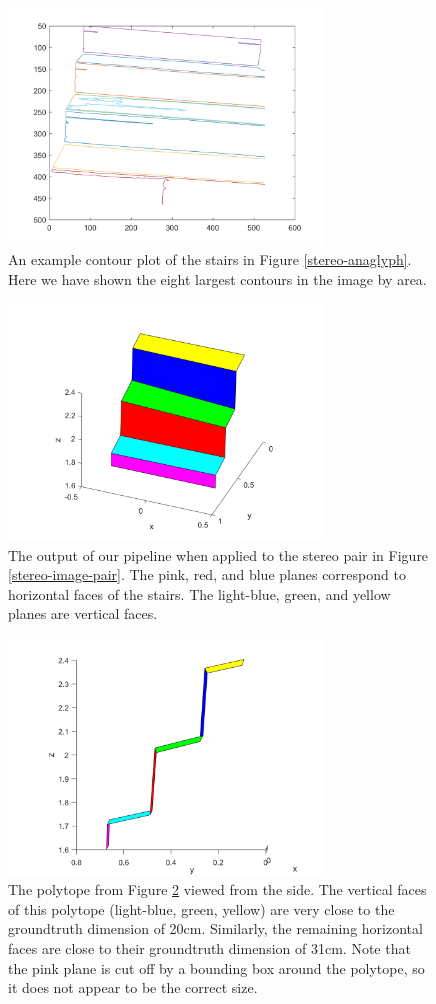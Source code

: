 \begin{figure}[!h]
\centering
\includegraphics[width=3.3in]{Sections/Figures/good_contour_plot_12-7.png}
\caption{An example contour plot of the stairs in Figure \ref{stereo-anaglyph}. Here we have shown the eight largest contours in the image by area.}
\label{contours-example}
\end{figure}

\begin{figure}[!h]
\centering
\includegraphics[width=3.3in]{Sections/Figures/polytope_example.png}
\caption{The output of our pipeline when applied to the stereo pair in Figure \ref{stereo-image-pair}. The pink, red, and blue planes correspond to horizontal faces of the stairs. The light-blue, green, and yellow planes are vertical faces.}
\label{polytope-diagonal}
\end{figure}

\begin{figure}[!h]
\centering
\includegraphics[width=3.3in]{Sections/Figures/polytope_sideview.png}
\caption{The polytope from Figure \ref{polytope-diagonal} viewed from the side. The vertical faces of this polytope (light-blue, green, yellow) are very close to the groundtruth dimension of 20cm. Similarly, the remaining horizontal faces are close to their groundtruth dimension of 31cm. Note that the pink plane is cut off by a bounding box around the polytope, so it does not appear to be the correct size.}
\label{polytope-sideview}
\end{figure}